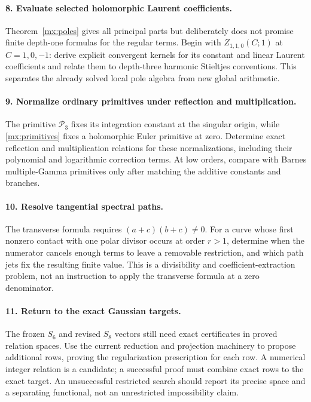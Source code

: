 \documentclass[11pt]{article}
\numberwithin{equation}{section}
\theoremstyle{definition}
\theoremstyle{remark}
\begin{document}
\paragraph{8. Evaluate selected holomorphic Laurent coefficients.}
Theorem~\ref{mx:poles} gives all principal parts but deliberately
does not promise finite depth-one formulas for the regular terms.
Begin with $Z_{1,1,0}(C;1)$ at $C=1,0,-1$: derive explicit
convergent kernels for its constant and linear Laurent coefficients
and relate them to depth-three harmonic Stieltjes conventions.
This separates the already solved local pole algebra from new
global arithmetic.

\paragraph{9. Normalize ordinary primitives under reflection and multiplication.}
The primitive $\mathcal P_3$ fixes its integration constant at the
singular origin, while \eqref{mx:primitives} fixes a holomorphic
Euler primitive at zero. Determine exact reflection and multiplication
relations for these normalizations, including their polynomial and
logarithmic correction terms. At low orders, compare with Barnes
multiple-Gamma primitives only after matching the additive constants
and branches.

\paragraph{10. Resolve tangential spectral paths.}
The transverse formula requires $(a+c)(b+c)\ne0$. For a curve
whose first nonzero contact with one polar divisor occurs at order
$r>1$, determine when the numerator cancels enough terms to leave
a removable restriction, and which path jets fix the resulting
finite value. This is a divisibility and coefficient-extraction
problem, not an instruction to apply the transverse formula at a
zero denominator.

\paragraph{11. Return to the exact Gaussian targets.}
The frozen $S_6$ and revised $S_8$ vectors still need exact
certificates in proved relation spaces. Use the current reduction
and projection machinery to propose additional rows, proving the
regularization prescription for each row. A numerical integer
relation is a candidate; a successful proof must combine exact
rows to the exact target. An unsuccessful restricted search should
report its precise space and a separating functional, not an
unrestricted impossibility claim.
\end{document}
